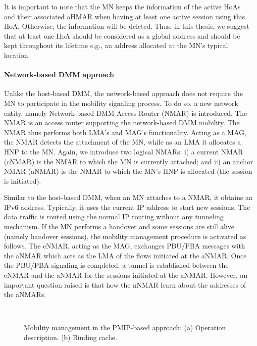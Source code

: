 It is important to note that the MN keeps the information of the active HoAs and their associated aHMAR when having at least one active session using this HoA. Otherwise, the information will be deleted. Thus, in this thesis, we suggest that at least one HoA should be considered as a global address and should be kept throughout its lifetime e.g., an address allocated at the MN's typical location. 

\paragraph{Network-based DMM approach}
Unlike the host-based DMM, the network-based approach does not require the MN to participate in the mobility signaling process. To do so, a new network entity, namely Network-based DMM Access Router (NMAR) is introduced. The NMAR is an access router supporting the network-based DMM mobility. The NMAR thus performs both LMA's and MAG's functionality. Acting as a MAG, the NMAR detects the attachment of the MN, while as an LMA it allocates a HNP to the MN. Again, we introduce two logical NMARs: i) a current NMAR (cNMAR) is the NMAR to which the MN is currently attached; and ii) an anchor NMAR (aNMAR) is the NMAR to which the MN's HNP is allocated (the session is initiated). 

Similar to the host-based DMM, when an MN attaches to a NMAR, it obtains an IPv6 address. Typically, it uses the current IP address to start new sessions. The data traffic is routed using the normal IP routing without any tunneling mechanism. If the MN performs a handover and some sessions are still alive (namely handover sessions), the mobility management procedure is activated as follows. The cNMAR, acting as the MAG, exchanges PBU/PBA messages with the aNMAR which acts as the LMA of the flows initiated at the aNMAR. Once the PBU/PBA signaling is completed, a tunnel is established between the cNMAR and the aNMAR for the sessions initiated at the aNMAR. However, an important question raised is that how the nNMAR learn about the addresses of the aNMARs. 
\begin{figure}[h!]
\centering
{}\,\,\,\,\,\,
\caption[Mobility management in the network-based approach.]{Mobility management in the PMIP-based approach: (a) Operation description. (b) Binding cache.}
\label{fig:c3_pmip_dmm}
\end{figure}

